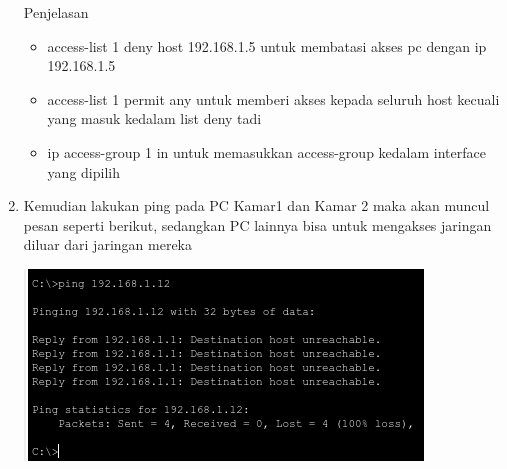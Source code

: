 \documentclass{article}
\begin{document}
\begin{flushleft}
\begin{enumerate}
            Penjelasan
            \begin{itemize}
                \item access-list 1 deny host 192.168.1.5 untuk membatasi akses pc dengan ip 192.168.1.5
                \item access-list 1 permit any untuk memberi akses kepada seluruh host kecuali yang masuk kedalam list deny tadi
                \item ip access-group 1 in untuk memasukkan access-group kedalam interface yang dipilih
            \end{itemize}

            \item Kemudian lakukan ping pada PC Kamar1 dan Kamar 2 maka akan muncul pesan seperti berikut, sedangkan PC lainnya bisa untuk mengakses jaringan diluar dari jaringan mereka

            \includegraphics[scale=0.7]{3-9.png}
        \end{enumerate}
    \end{flushleft}
\end{document}
